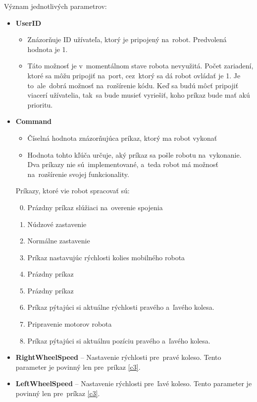 	\noindent Význam jednotlivých parametrov:
	\begin{itemize}
		\item \textbf{UserID}
			\begin{itemize}
				\item Znázorňuje ID užívateľa, ktorý je pripojený na~robot. Predvolená hodnota je 1.
				\item Táto možnosť je v~momentálnom stave robota nevyužitá. Počet zariadení, ktoré sa môžu pripojiť na~port,
			   cez~ktorý sa dá robot ovládať je 1. Je to~ale~dobrá možnosť na~rozšírenie kódu. Keď sa budú môcť pripojiť
			   viacerí užívatelia, tak~sa bude musieť vyriešiť, koho príkaz bude mať akú prioritu.
			\end{itemize}

		\item \textbf{Command}
			\begin{itemize}
				\item Číselná hodnota znázorňujúca príkaz, ktorý ma robot vykonať
				\item Hodnota tohto kľúča určuje, aký príkaz sa pošle robotu na~vykonanie. Dva príkazy nie sú~implementované,
				a~teda robot má možnosť na~rozšírenie svojej funkcionality.
			\end{itemize}

			Príkazy, ktoré vie robot spracovať sú:
			\begin{enumerate}
				\setcounter{enumi}{-1}
				\item \label{c0} Prázdny príkaz slúžiaci na~overenie spojenia
				\item \label{c1} Núdzové zastavenie
				\item \label{c2} Normálne zastavenie
				\item \label{c3} Príkaz nastavujúc rýchlosti kolies mobilného robota
				\item \label{c4} Prázdny príkaz
				\item \label{c5} Prázdny príkaz
				\item \label{c6} Príkaz pýtajúci si aktuálne rýchlosti pravého a~ľavého kolesa.
				\item \label{c7} Pripravenie motorov robota
				\item \label{c8}
					Príkaz pýtajúci si aktuálnu pozíciu pravého a~ľavého kolesa.
			\end{enumerate}
		\item \textbf{RightWheelSpeed} -- Nastavenie rýchlosti pre~pravé koleso. Tento parameter je povinný len
			pre~príkaz \ref{c3}.
		\item \textbf{LeftWheelSpeed} -- Nastavenie rýchlosti pre~ľavé koleso. Tento parameter je povinný len
			pre~príkaz \ref{c3}.
	\end{itemize}

